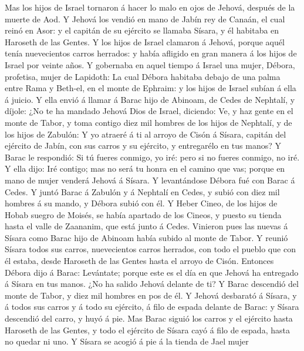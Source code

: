  Mas los hijos de Israel tornaron á hacer lo malo en ojos
de Jehová, después de la muerte de Aod.  Y Jehová los
vendió en mano de Jabín rey de Canaán, el cual reinó en Asor: y el
capitán de su ejército se llamaba Sísara, y él habitaba en Haroseth de
las Gentes.  Y los hijos de Israel clamaron á Jehová,
porque aquél tenía nuevecientos carros herrados: y había afligido en
gran manera á los hijos de Israel por veinte años.  Y
gobernaba en aquel tiempo á Israel una mujer, Débora, profetisa, mujer
de Lapidoth:  La cual Débora habitaba debajo de una palma
entre Rama y Beth-el, en el monte de Ephraim: y los hijos de Israel
subían á ella á juicio.  Y ella envió á llamar á Barac
hijo de Abinoam, de Cedes de Nephtalí, y díjole: ¿No te ha mandado
Jehová Dios de Israel, diciendo: Ve, y haz gente en el monte de Tabor, y
toma contigo diez mil hombres de los hijos de Nephtalí, y de los hijos
de Zabulón:  Y yo atraeré á ti al arroyo de Cisón á
Sísara, capitán del ejército de Jabín, con sus carros y su ejército, y
entregarélo en tus manos?  Y Barac le respondió: Si tú
fueres conmigo, yo iré: pero si no fueres conmigo, no iré.
 Y ella dijo: Iré contigo; mas no será tu honra en el
camino que vas; porque en mano de mujer venderá Jehová á Sísara. Y
levantándose Débora fué con Barac á Cedes.  Y juntó Barac
á Zabulón y á Nephtalí en Cedes, y subió con diez mil hombres á su
mando, y Débora subió con él.  Y Heber Cineo, de los
hijos de Hobab suegro de Moisés, se había apartado de los Cineos, y
puesto su tienda hasta el valle de Zaananim, que está junto á Cedes.
 Vinieron pues las nuevas á Sísara como Barac hijo de
Abinoam había subido al monte de Tabor.  Y reunió Sísara
todos sus carros, nuevecientos carros herrados, con todo el pueblo que
con él estaba, desde Haroseth de las Gentes hasta el arroyo de Cisón.
 Entonces Débora dijo á Barac: Levántate; porque este es
el día en que Jehová ha entregado á Sísara en tus manos. ¿No ha salido
Jehová delante de ti? Y Barac descendió del monte de Tabor, y diez mil
hombres en pos de él.  Y Jehová desbarató á Sísara, y á
todos sus carros y á todo su ejército, á filo de espada delante de
Barac: y Sísara descendió del carro, y huyó á pie.  Mas
Barac siguió los carros y el ejército hasta Haroseth de las Gentes, y
todo el ejército de Sísara cayó á filo de espada, hasta no quedar ni
uno.  Y Sísara se acogió á pie á la tienda de Jael mujer
